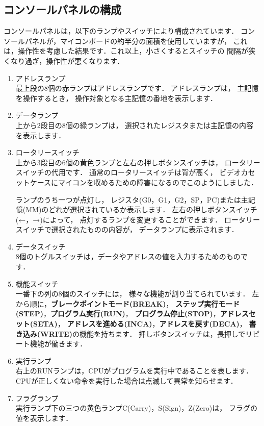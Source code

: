 \subsection{コンソールパネルの構成}
コンソールパネルは，以下のランプやスイッチにより構成されています．
コンソールパネルが，マイコンボードの約半分の面積を使用していますが，
これは，操作性を考慮した結果です．これ以上，小さくするとスイッチの
間隔が狭くなり過ぎ，操作性が悪くなります．

\begin{enumerate}
\item アドレスランプ \\
最上段の8個の赤ランプはアドレスランプです．
アドレスランプは，
主記憶を操作するとき，
操作対象となる主記憶の番地を表示します．

\item データランプ \\
上から2段目の8個の緑ランプは，
選択されたレジスタまたは主記憶の内容を表示します．

\item ロータリースイッチ \\
上から3段目の6個の黄色ランプと左右の押しボタンスイッチは，
ロータリースイッチの代用です．
通常のロータリースイッチは背が高く，
ビデオカセットケースにマイコンを収めるための障害になるのでこのようにしました．

ランプのうち一つが点灯し，
レジスタ(G0，G1，G2，SP，PC)または主記憶(MM)のどれが選択されているか表示します．
左右の押しボタンスイッチ(←，→)によって，
点灯するランプを変更することができます．
ロータリースイッチで選択されたものの内容が，
データランプに表示されます．

\item データスイッチ \\
8個のトグルスイッチは，データやアドレスの値を入力するためのものです．

\item 機能スイッチ \\
一番下の列の8個のスイッチには，
様々な機能が割り当てられています．
左から順に，{\bf ブレークポイントモード(BREAK)}，
{\bf ステップ実行モード(STEP)}，{\bf プログラム実行(RUN)}，
{\bf プログラム停止(STOP)}，{\bf アドレスセット(SETA)}，
{\bf アドレスを進める(INCA)}，{\bf アドレスを戻す(DECA)}，
{\bf 書き込み(WRITE)}の機能を持ちます．
押しボタンスイッチは，長押しでリピート機能が働きます．

\item 実行ランプ \\
右上のRUNランプは，CPUがプログラムを実行中であることを表します．
CPUが正しくない命令を実行した場合は点滅して異常を知らせます．

\item フラグランプ \\
実行ランプ下の三つの黄色ランプC(Carry)，S(Sign)，Z(Zero)は，
フラグの値を表示します．
\end{enumerate}

